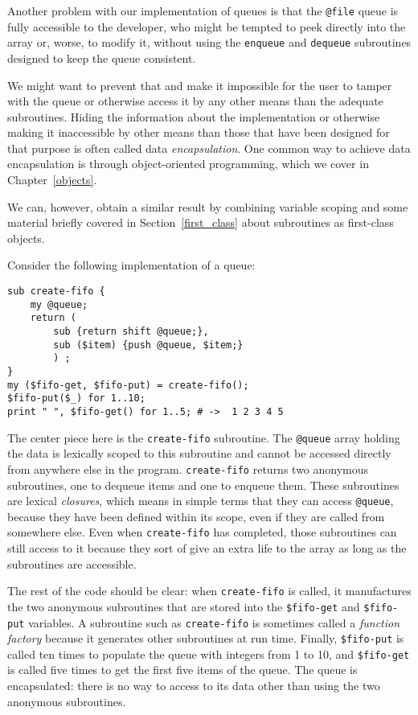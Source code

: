 Another problem with our implementation of queues is that 
the \verb'@file' queue is fully accessible to the developer, 
who might be tempted to peek directly into the array or, 
worse, to modify it, without using the {\tt enqueue} and 
{\tt dequeue} subroutines designed to keep the queue 
consistent. 

We might want to prevent that and make it impossible for 
the user to tamper with the queue or otherwise access it by 
any other means than the adequate subroutines. Hiding the 
information about the implementation or otherwise making 
it inaccessible by other means than those that have been 
designed for that purpose is often called data 
\emph{encapsulation}. One common way to achieve data 
encapsulation is through object-oriented programming, which 
we cover in Chapter~\ref{objects}. 

We can, however, obtain 
a similar result by combining variable scoping and some 
material briefly covered in Section~\ref{first_class} about 
subroutines as first-class objects.

Consider the following implementation of a queue:
\begin{verbatim}
sub create-fifo {
    my @queue;
    return (
        sub {return shift @queue;}, 
        sub ($item) {push @queue, $item;}
        ) ;
}
my ($fifo-get, $fifo-put) = create-fifo();
$fifo-put($_) for 1..10;
print " ", $fifo-get() for 1..5; # ->  1 2 3 4 5
\end{verbatim}
%
The center piece here is the {\tt create-fifo} subroutine.
The \verb'@queue' array holding the data is lexically 
scoped to this subroutine and cannot be accessed directly 
from anywhere else in the program. {\tt create-fifo} returns 
two anonymous subroutines, one to dequeue items and one 
to enqueue them. These subroutines are lexical \emph{closures}, 
which means in simple terms that they can access 
\verb'@queue', because they have been defined within its 
scope, even if they are called from somewhere else. Even 
when {\tt create-fifo} has completed, those subroutines 
can still access to it because they sort of give an extra 
life to the array as long as the subroutines are accessible.

The rest of the code should be clear: when {\tt create-fifo} is 
called, it manufactures the two anonymous subroutines that 
are stored into the \verb'$fifo-get' and \verb'$fifo-put' 
variables. A subroutine such as {\tt create-fifo} is 
sometimes called a \emph{function factory} because it 
generates other subroutines at run time.
Finally, \verb'$fifo-put' is called ten times to 
populate the queue with integers from 1 to 10, and 
\verb'$fifo-get' is called five times to get the first five 
items of the queue. The queue is encapsulated: there is 
no way to access to its data other than using the two 
anonymous subroutines.

